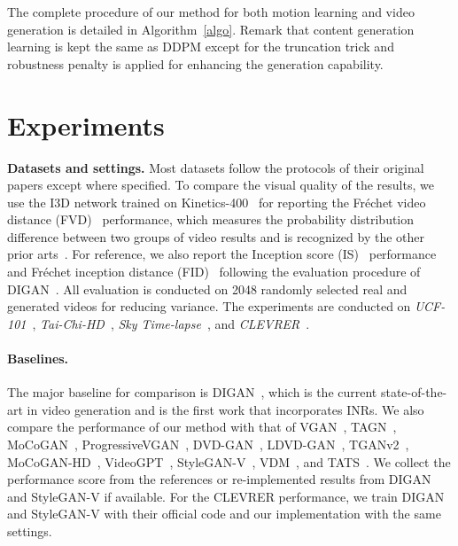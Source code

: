 \documentclass[letterpaper]{article}
\begin{document}
The complete procedure of our method for both motion learning and video generation is detailed in Algorithm~\ref{algo}.
Remark that content generation learning is kept the same as DDPM except for the truncation trick and robustness penalty is applied for enhancing the generation capability.

\section{Experiments}

\textbf{Datasets and settings.}
Most datasets follow the protocols of their original papers except where specified.
To compare the visual quality of the results, we use the I3D network trained on Kinetics-400~\cite{kay2017kinetics} for reporting the Fr\'echet video distance (FVD)~\cite{unterthiner2018towards} performance, which measures the probability distribution difference between two groups of video results and is recognized by the other prior arts~\cite{yu2022generating, skorokhodov2021stylegan}.
For reference, we also report the Inception score (IS)~\cite{salimans2016improved} performance and Fr\'echet inception distance (FID)~\cite{heusel2017gans} following the evaluation procedure of DIGAN~\cite{yu2022generating}.
All evaluation is conducted on 2048 randomly selected real and generated videos for reducing variance. The experiments are conducted on \emph{UCF-101}~\cite{soomro2012ucf101}, \emph{Tai-Chi-HD}~\cite{siarohin2019first}, \emph{Sky Time-lapse}~\cite{xiong2018learning}, and \emph{CLEVRER}~\cite{yi2020clevrer}.

\paragraph{Baselines.}
The major baseline for comparison is DIGAN~\cite{yu2022generating}, which is the current state-of-the-art in video generation and is the first work that incorporates INRs.
We also compare the performance of our method with that of VGAN~\cite{vondrick2016generating}, TAGN~\cite{saito2017temporal}, MoCoGAN~\cite{tulyakov2018mocogan}, ProgressiveVGAN~\cite{acharya2018towards}, DVD-GAN~\cite{clark2019adversarial}, LDVD-GAN~\cite{kahembwe2020lower}, TGANv2~\cite{saito2020train}, MoCoGAN-HD~\cite{tian2021good}, VideoGPT~\cite{yan2021videogpt}, StyleGAN-V~\cite{skorokhodov2021stylegan}, VDM~\cite{ho2022video},  and TATS~\cite{ge2022long}.
We collect the performance score from the references or re-implemented results from DIGAN and StyleGAN-V if available.
For the CLEVRER performance, we train DIGAN and StyleGAN-V with their official code and our implementation with the same settings.
\end{document}
